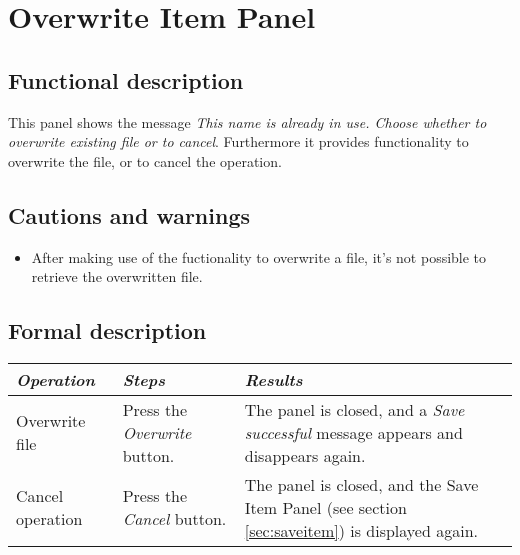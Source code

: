 \section{Overwrite Item Panel}
\label{sec:overwriteitem}
  \subsection*{Functional description}
  This panel shows the message \emph{This name is already in use. Choose whether to overwrite existing file or to cancel}. Furthermore it provides functionality to overwrite the file, or to cancel the operation.

  \subsection*{Cautions and warnings}
  \begin{itemize}
  \item After making use of the fuctionality to overwrite a file, it's not possible to retrieve the overwritten file.
  \end{itemize}

  \subsection*{Formal description}
    \begin{tabularx}{\textwidth}{XXX}
    \toprule
    \emph{Operation} & \emph{Steps} & \emph{Results} \\
    \midrule
    Overwrite file & Press the \emph{Overwrite} button. & The panel is closed, and a \emph{Save successful} message appears and disappears again. \\
    \midrule
    Cancel operation & Press the \emph{Cancel} button. & The panel is closed, and the Save Item Panel (see section \ref{sec:saveitem}) is displayed again. \\
    \bottomrule
\end{tabularx}

